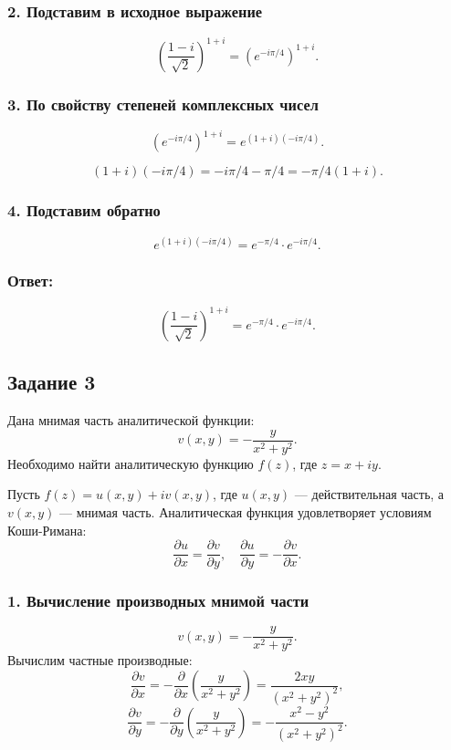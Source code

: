 \documentclass[a4paper,12pt]{article}
\begin{document}
\subsubsection*{2. Подставим в исходное выражение}
\[
\left( \frac{1 - i}{\sqrt{2}} \right)^{1+i} = \left( e^{-i\pi/4} \right)^{1+i}.
\]

\subsubsection*{3. По свойству степеней комплексных чисел}
\[
\left( e^{-i\pi/4} \right)^{1+i} = e^{(1+i)(-i\pi/4)}.
\]

\[
(1+i)(-i\pi/4) = -i\pi/4 - \pi/4 = -\pi/4 (1 + i).
\]

\subsubsection*{4. Подставим обратно}
\[
e^{(1+i)(-i\pi/4)} = e^{-\pi/4} \cdot e^{-i\pi/4}.
\]

\subsubsection*{Ответ:}
\[
\left( \frac{1 - i}{\sqrt{2}} \right)^{1+i} = e^{-\pi/4} \cdot e^{-i\pi/4}.
\]

\subsection*{Задание 3}

Дана мнимая часть аналитической функции:
\[
v(x, y) = -\frac{y}{x^2 + y^2}.
\]
Необходимо найти аналитическую функцию \(f(z)\), где \(z = x + iy\).

Пусть \(f(z) = u(x, y) + iv(x, y)\), где \(u(x, y)\) — действительная часть, а \(v(x, y)\) — мнимая часть. Аналитическая функция удовлетворяет условиям Коши-Римана:
\[
\frac{\partial u}{\partial x} = \frac{\partial v}{\partial y}, \quad \frac{\partial u}{\partial y} = -\frac{\partial v}{\partial x}.
\]

\subsubsection*{1. Вычисление производных мнимой части}
\[
v(x, y) = -\frac{y}{x^2 + y^2}.
\]
Вычислим частные производные:
\[
\frac{\partial v}{\partial x} = -\frac{\partial}{\partial x} \left( \frac{y}{x^2 + y^2} \right) = \frac{2xy}{(x^2 + y^2)^2},
\]
\[
\frac{\partial v}{\partial y} = -\frac{\partial}{\partial y} \left( \frac{y}{x^2 + y^2} \right) = -\frac{x^2 - y^2}{(x^2 + y^2)^2}.
\]
\end{document}
